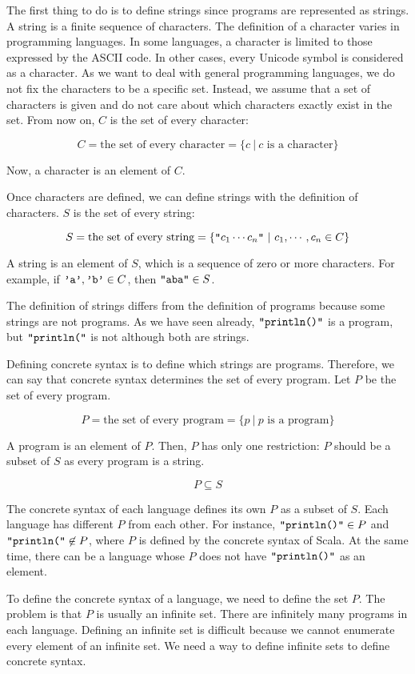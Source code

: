 The first thing to do is to define strings since programs are represented as
strings. A string is a finite sequence of characters. The definition of a
character varies in programming languages. In some languages, a character is
limited to those expressed by the ASCII code. In other cases, every Unicode symbol
is considered as a character. As we want to deal with general programming
languages, we do not fix the characters to be a specific set. Instead, we assume
that a set of characters is given and do not care about which characters exactly
exist in the set. From now on, $C$ is the set of every character:

\[C = \text{the set of every character} = \{ c\ |\ c\text{ is a character} \}\]

Now, a character is an element of $C$.

Once characters are defined, we can define strings with the definition of
characters. $S$ is the set of every string:

\[S = \text{the set of every string} = \{ \texttt{"}c_1\cdots c_n\texttt{"}\ |\
c_1,\cdots,c_n\in C \}\]

A string is an element of $S$, which is a
sequence of zero or more characters. For example, if $\texttt{'a'},\texttt{'b'}\in
C$, then $\texttt{"aba"}\in S$.

The definition of strings differs from the definition of programs because some
strings are not programs. As we have seen already, $\texttt{"println()"}$ is a program,
but $\texttt{"println("}$ is not although both are strings.

Defining concrete syntax is to define which strings are programs. Therefore,
we can say that concrete syntax determines the set of every program.
Let $P$ be the set of every program.

\[P = \text{the set of every program} = \{ p\ |\ p\text{ is a program} \}\]

A program is an element of $P$.
Then, $P$ has only one restriction: $P$ should be a subset of $S$ as
every program is a string.

\[P\subseteq S\]

The concrete syntax of each language defines its own $P$ as a subset of
$S$. Each language has different $P$ from each other. For instance,
$\texttt{"println()"} \in P$ and $\texttt{"println("}\not\in P$,
where $P$ is defined by the concrete syntax of Scala. At the same
time, there can be a language whose $P$ does not have $\texttt{"println()"}$ as an element.

To define the concrete syntax of a language, we need to define the set $P$. The
problem is that $P$ is usually an infinite set. There are infinitely many
programs in each language. Defining an infinite set is difficult because we
cannot enumerate every element of an infinite set. We need a way to define
infinite sets to define concrete syntax.

